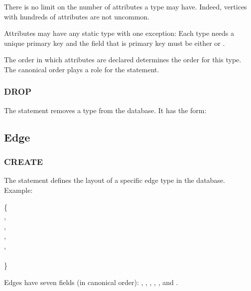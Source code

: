 There is no limit on the number of attributes
a type may have. Indeed, vertices with hundreds
of attributes are not uncommon.

Attributes may have any static type with one exception:
Each type needs a unique primary key and the field
that is primary key must be either
 or .

The order in which attributes are declared
determines the  order for this type.
The canonical order plays a role for the 
statement.

\subsubsection{DROP}
The  statement removes a type
from the database. 
It has the form:

 

\subsection{Edge}
\subsubsection{CREATE}
The  statement defines the layout
of a specific edge type in the database.
Example:

  \{ \\
\hspace*{1cm}    , \\
\hspace*{1cm}    , \\
\hspace*{1cm}  , \\
\hspace*{1cm}    , \\
\hspace*{1cm}     \\
\}

Edges have seven fields (in canonical order):
,
, ,
, ,
 and .

